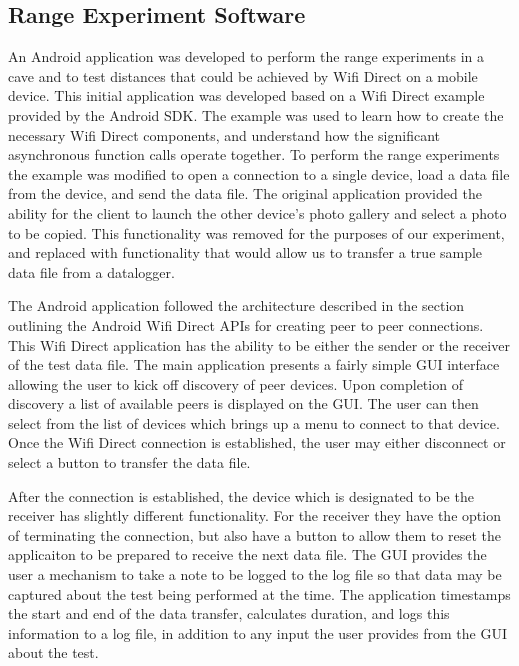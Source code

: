 \documentclass[10pt,twocolumn]{article}
\begin{document}

\subsection{Range Experiment Software}
An Android application was developed to perform the range experiments in a cave and to test distances that could be achieved by Wifi Direct on a mobile device.
This initial application was developed based on a Wifi Direct example provided by the Android SDK.
The example was used to learn how to create the necessary Wifi Direct components, and understand how the significant asynchronous function calls operate together.
To perform the range experiments the example was modified to open a connection to a single device, load a data file from the device, and send the data file. 
The original application provided the ability for the client to launch the other device's photo gallery and select a photo to be copied.
This functionality was removed for the purposes of our experiment, and replaced with functionality that would allow us to transfer a true sample data file from a datalogger.

The Android application followed the architecture described in the section outlining the Android Wifi Direct APIs for creating peer to peer connections. 
This Wifi Direct application has the ability to be either the sender or the receiver of the test data file.
The main application presents a fairly simple GUI interface allowing the user to kick off discovery of peer devices. 
Upon completion of discovery a list of available peers is displayed on the GUI.
The user can then select from the list of devices which brings up a menu to connect to that device.
Once the Wifi Direct connection is established, the user may either disconnect or select a button to transfer the data file.

After the connection is established, the device which is designated to be the receiver has slightly different functionality.
For the receiver they have the option of terminating the connection, but also have a button to allow them to reset the applicaiton to be prepared to receive the next data file.
The GUI provides the user a mechanism to take a note to be logged to the log file so that data may be captured about the test being performed at the time.
The application timestamps the start and end of the data transfer, calculates duration, and logs this information to a log file, in addition to any input the user provides from the GUI about the test.
\end{document}
